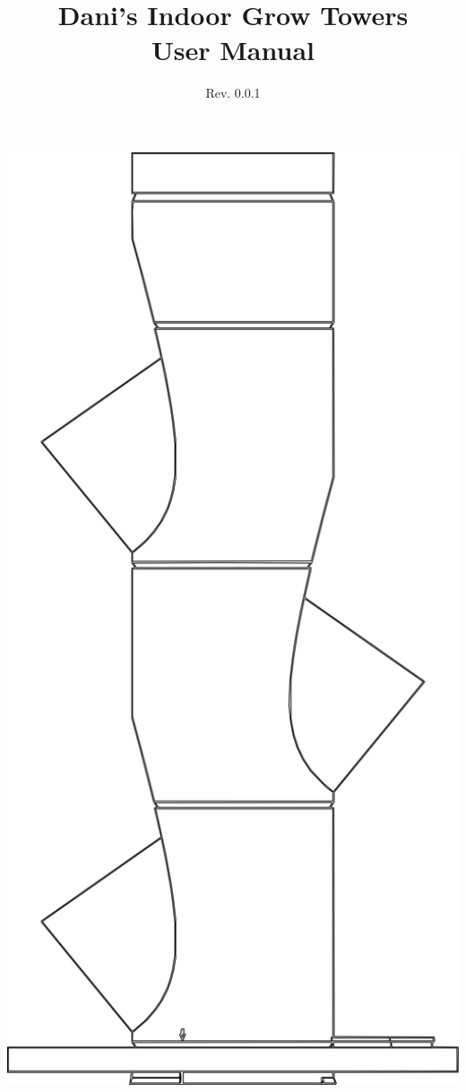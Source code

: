 \documentclass{tower-manual}
\title{Dani's Indoor Grow Towers \\User Manual}
\author{Rev. 0.0.1}
\date{}
\begin{document}

\begin{titlepage}
    \maketitle

    \begin{center}
        \begin{minipage}{0.45\textwidth}
            \includegraphics[width=1.0\textwidth]{images/80mm_wireframe.png}

\end{minipage}
\end{center}
\end{titlepage}
\end{document}
